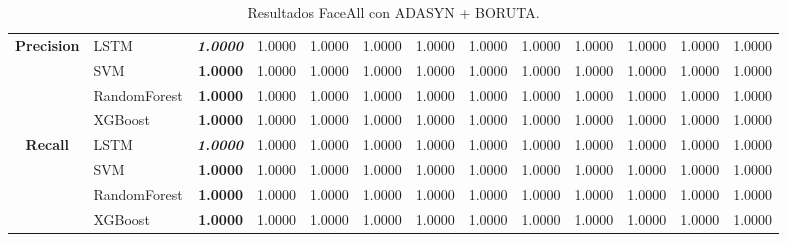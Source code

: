 \begin{table}[H]
\begin{adjustbox}{max width=12cm}
\begin{tabular}{|c|l|r|r|r|r|r|r|r|r|r|r|r|}
			\textbf{Precision} & LSTM &  \textit{\textbf{1.0000}} &  1.0000 &  1.0000 &  1.0000 &  1.0000 &  1.0000 &  1.0000 &  1.0000 &  1.0000 &  1.0000 &  1.0000 \\
			& SVM &  \textbf{1.0000} &  1.0000 &  1.0000 &  1.0000 &  1.0000 &  1.0000 &  1.0000 &  1.0000 &  1.0000 &  1.0000 &  1.0000 \\
			& RandomForest &  \textbf{1.0000} &  1.0000 &  1.0000 &  1.0000 &  1.0000 &  1.0000 &  1.0000 &  1.0000 &  1.0000 &  1.0000 &  1.0000 \\
			& XGBoost &  \textbf{1.0000} &  1.0000 &  1.0000 &  1.0000 &  1.0000 &  1.0000 &  1.0000 &  1.0000 &  1.0000 &  1.0000 &  1.0000 \\
			\hline
			\textbf{Recall} & LSTM &  \textit{\textbf{1.0000}} &  1.0000 &  1.0000 &  1.0000 &  1.0000 &  1.0000 &  1.0000 &  1.0000 &  1.0000 &  1.0000 &  1.0000 \\
			& SVM &  \textbf{1.0000} &  1.0000 &  1.0000 &  1.0000 &  1.0000 &  1.0000 &  1.0000 &  1.0000 &  1.0000 &  1.0000 &  1.0000 \\
			& RandomForest &  \textbf{1.0000} &  1.0000 &  1.0000 &  1.0000 &  1.0000 &  1.0000 &  1.0000 &  1.0000 &  1.0000 &  1.0000 &  1.0000 \\
			& XGBoost &  \textbf{1.0000} &  1.0000 &  1.0000 &  1.0000 &  1.0000 &  1.0000 &  1.0000 &  1.0000 &  1.0000 &  1.0000 &  1.0000 \\
			\hline
			
		\end{tabular}
	\end{adjustbox}	
	\caption{Resultados FaceAll con ADASYN + BORUTA.}
	\label{tab:faceAllADASYNBORUTA}
\end{table}

